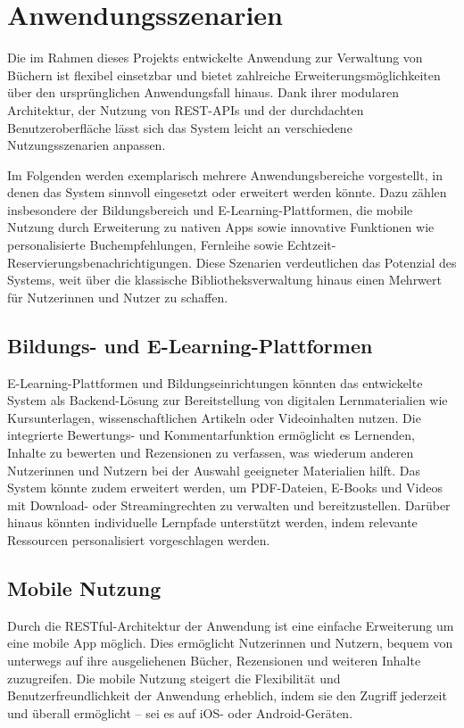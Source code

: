 \chapter{Anwendungsszenarien}

Die im Rahmen dieses Projekts entwickelte Anwendung zur Verwaltung von Büchern ist flexibel einsetzbar und bietet zahlreiche Erweiterungsmöglichkeiten über den ursprünglichen Anwendungsfall hinaus. Dank ihrer modularen Architektur, der Nutzung von REST-APIs und der durchdachten Benutzeroberfläche lässt sich das System leicht an verschiedene Nutzungsszenarien anpassen.

\noindent Im Folgenden werden exemplarisch mehrere Anwendungsbereiche vorgestellt, in denen das System sinnvoll eingesetzt oder erweitert werden könnte. Dazu zählen insbesondere der Bildungsbereich und E-Learning-Plattformen, die mobile Nutzung durch Erweiterung zu nativen Apps sowie innovative Funktionen wie personalisierte Buchempfehlungen, Fernleihe sowie Echtzeit-Reservierungsbenachrichtigungen. Diese Szenarien verdeutlichen das Potenzial des Systems, weit über die klassische Bibliotheksverwaltung hinaus einen Mehrwert für Nutzerinnen und Nutzer zu schaffen.

\section{Bildungs- und E-Learning-Plattformen}

E-Learning-Plattformen und Bildungseinrichtungen könnten das entwickelte System als Backend-Lösung zur Bereitstellung von digitalen Lernmaterialien wie Kursunterlagen, wissenschaftlichen Artikeln oder Videoinhalten nutzen. Die integrierte Bewertungs- und Kommentarfunktion ermöglicht es Lernenden, Inhalte zu bewerten und Rezensionen zu verfassen, was wiederum anderen Nutzerinnen und Nutzern bei der Auswahl geeigneter Materialien hilft. Das System könnte zudem erweitert werden, um PDF-Dateien, E-Books und Videos mit Download- oder Streamingrechten zu verwalten und bereitzustellen. Darüber hinaus könnten individuelle Lernpfade unterstützt werden, indem relevante Ressourcen personalisiert vorgeschlagen werden.

\section{Mobile Nutzung}

Durch die RESTful-Architektur der Anwendung ist eine einfache Erweiterung um eine mobile App möglich. Dies ermöglicht Nutzerinnen und Nutzern, bequem von unterwegs auf ihre ausgeliehenen Bücher, Rezensionen und weiteren Inhalte zuzugreifen. Die mobile Nutzung steigert die Flexibilität und Benutzerfreundlichkeit der Anwendung erheblich, indem sie den Zugriff jederzeit und überall ermöglicht – sei es auf iOS- oder Android-Geräten.


